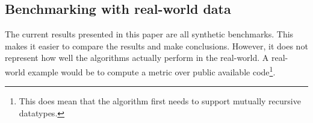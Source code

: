 \subsection{Benchmarking with real-world data}
The current results presented in this paper are all synthetic benchmarks. This makes it easier to compare the results and make conclusions. However, it does not represent how well the algorithms actually perform in the real-world. A real-world example would be to compute a metric over public available code\footnote{This does mean that the algorithm first needs to support mutually recursive datatypes.}.

